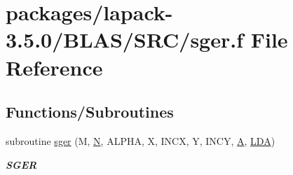 \hypertarget{lapack-3_85_80_2BLAS_2SRC_2sger_8f}{}\section{packages/lapack-\/3.5.0/\+B\+L\+A\+S/\+S\+R\+C/sger.f File Reference}
\label{lapack-3_85_80_2BLAS_2SRC_2sger_8f}
\subsection*{Functions/\+Subroutines}
\begin{DoxyCompactItemize}
\item 
subroutine \hyperlink{group__single__blas__level2_ga408fbda62b1284363c01d7595da11292}{sger} (M, \hyperlink{polmisc_8c_a0240ac851181b84ac374872dc5434ee4}{N}, A\+L\+P\+H\+A, X, I\+N\+C\+X, Y, I\+N\+C\+Y, \hyperlink{classA}{A}, \hyperlink{example__user_8c_ae946da542ce0db94dced19b2ecefd1aa}{L\+D\+A})
\begin{DoxyCompactList}\small\item\em {\bfseries S\+G\+E\+R} \end{DoxyCompactList}\end{DoxyCompactItemize}
